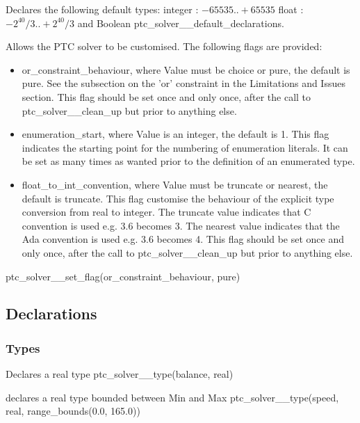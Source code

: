 \documentclass{article}
\begin{document}
    {Declares the following default types:
    integer : $-65535 .. +65535$
        float : $-2^{40}/3 .. +2^{40}/3$
    and Boolean}
    {ptc\_solver\_\_default\_declarations.}
    {}

    {Allows the PTC solver to be customised. The following flags are
provided:
     \begin{itemize}
      \item or\_constraint\_behaviour, where Value must be choice or pure,
the default is pure.
      See the subsection on the 'or' constraint in the Limitations and Issues
section. This flag
      should be set once and only once, after the call to
ptc\_solver\_\_clean\_up but prior
      to anything else.
      \item enumeration\_start, where Value is an integer, the default is 1.
This flag
      indicates the starting point for the numbering of enumeration literals.
It can be set as many
      times as wanted prior to the definition of an enumerated type.
      \item float\_to\_int\_convention, where Value must be truncate or
nearest, the default is truncate. This flag customise the behaviour of
the explicit type conversion from real to integer. The truncate value
indicates that C convention is used e.g. 3.6 becomes 3. The nearest
value indicates that the Ada convention is used e.g. 3.6 becomes 4.
This flag
      should be set once and only once, after the call to
ptc\_solver\_\_clean\_up but prior
      to anything else.
     \end{itemize}
     }
    {ptc\_solver\_\_set\_flag(or\_constraint\_behaviour, pure)}
    {}

\subsection{Declarations}

\subsubsection{Types}

\hspace{\parindent}
        {Declares a real type}
        {ptc\_solver\_\_type(balance, real)}
        {}

        {declares a real type bounded between Min and Max}
        {ptc\_solver\_\_type(speed, real, range\_bounds(0.0, 165.0))}
        {}
\end{document}
